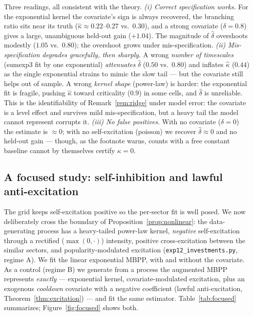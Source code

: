 \documentclass[11pt]{article}
\theoremstyle{plain}
\theoremstyle{definition}
\theoremstyle{remark}
\newcommand{\code}[1]{\texttt{#1}}
\begin{document}
Three readings, all consistent with the theory.
\emph{(i) Correct specification works.} For the exponential kernel the covariate's
sign is always recovered, the branching ratio sits near its truth
($\hat\kappa\approx0.22$--$0.27$ vs.\ $0.30$), and a strong covariate
($\delta=0.8$) gives a large, unambiguous held-out gain ($+1.04$). The magnitude of
$\hat\delta$ overshoots modestly ($1.05$ vs.\ $0.80$); the overshoot grows under
mis-specification.
\emph{(ii) Mis-specification degrades gracefully, then sharply.} A wrong
\emph{number of timescales} (sumexp3 fit by one exponential) \emph{attenuates}
$\hat\delta$ ($0.50$ vs.\ $0.80$) and inflates $\hat\kappa$ ($0.44$) as the single
exponential strains to mimic the slow tail --- but the covariate still helps out of
sample. A wrong \emph{kernel shape} (power-law) is harder: the exponential fit is
fragile, pushing $\hat\kappa$ toward criticality ($0.9$) in some cells, and
$\hat\delta$ is unreliable. This is the identifiability of Remark~\ref{rem:ridge}
under model error: the covariate is a level effect and survives mild
mis-specification, but a heavy tail the model cannot represent corrupts it.
\emph{(iii) No false positives.} With no covariate ($\delta=0$) the estimate is
$\approx0$; with no self-excitation (poisson) we recover $\hat\delta\approx0$ and no
held-out gain --- though, as the footnote warns, counts with a free constant
baseline cannot by themselves certify $\kappa=0$.

\subsection{A focused study: self-inhibition and lawful anti-excitation}
\label{sec:focused}

The grid keeps self-excitation positive so the per-sector fit is well posed. We now
deliberately cross the boundary of Proposition~\ref{prop:nonlinear}: the
data-generating process has a heavy-tailed power-law kernel, \emph{negative}
self-excitation through a rectified ($\max(0,\cdot)$) intensity, positive
cross-excitation between the similar sectors, and popularity-modulated excitation
(\code{exp12\_investments.py}, regime A). We fit the linear exponential MBPP, with
and without the covariate. As a control (regime B) we generate from a process the
augmented MBPP represents \emph{exactly} --- exponential kernel, covariate-modulated
excitation, plus an exogenous \emph{cooldown} covariate with a negative coefficient
(lawful anti-excitation, Theorem~\ref{thm:excitation}) --- and fit the same
estimator. Table~\ref{tab:focused} summarizes; Figure~\ref{fig:focused} shows both.
\end{document}
